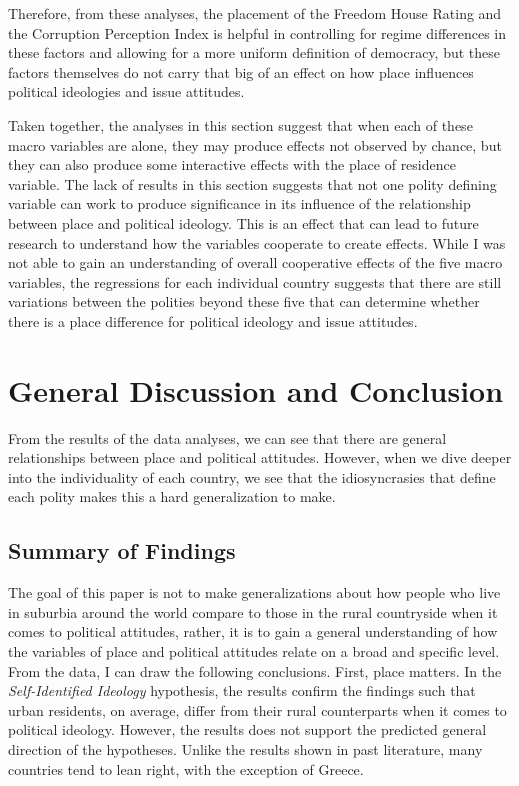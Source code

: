 \documentclass[12pt, titlepage]{article}
\newcommand\e{\emph}
\begin{document}
Therefore, from these analyses, the placement of the Freedom House Rating and the Corruption Perception Index is helpful in controlling for regime differences in these factors and allowing for a more uniform definition of democracy, but these factors themselves do not carry that big of an effect on how place influences political ideologies and issue attitudes. 

Taken together, the analyses in this section suggest that when each of these macro variables are alone, they may produce effects not observed by chance, but they can also produce some interactive effects with the place of residence variable. The lack of results in this section suggests that not one polity defining variable can work to produce significance in its influence of the relationship between place and political ideology. This is an effect that can lead to future research to understand how the variables cooperate to create effects. While I was not able to gain an understanding of overall cooperative effects of the five macro variables, the regressions for each individual country suggests that there are still variations between the polities beyond these five that can determine whether there is a place difference for political ideology and issue attitudes. 

\section{General Discussion and Conclusion}

From the results of the data analyses, we can see that there are general relationships between place and political attitudes. However, when we dive deeper into the individuality of each country, we see that the idiosyncrasies that define each polity makes this a hard generalization to make. 

\subsection{Summary of Findings}

The goal of this paper is not to make generalizations about how people who live in suburbia around the world compare to those in the rural countryside when it comes to political attitudes, rather, it is to gain a general understanding of how the variables of place and political attitudes relate on a broad and specific level. From the data, I can draw the following conclusions. First, place matters. In the \e{Self-Identified Ideology} hypothesis, the results confirm the findings such that urban residents, on average, differ from their rural counterparts when it comes to political ideology. However, the results does not support the predicted general direction of the hypotheses. Unlike the results shown in past literature, many countries tend to lean right, with the exception of Greece.
\end{document}
